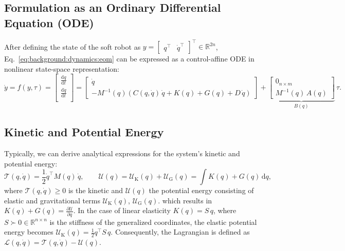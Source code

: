 \subsection{Formulation as an Ordinary Differential Equation (ODE)}
After defining the state of the soft robot as $y = \begin{bmatrix}
    q^\top & \dot{q}^\top
\end{bmatrix}^\top \in \mathbb{R}^{2n}$, Eq.~\ref{eq:background:dynamics:eom} can be expressed as a control-affine \gls{ODE} in nonlinear state-space representation:
\begin{equation}
    \dot{y} = f(y,\tau) = \begin{bmatrix}
        \frac{\mathrm{d} q}{\mathrm{d}t}\\
        \frac{\mathrm{d} \dot{q}}{\mathrm{d}t}\\
    \end{bmatrix} = \begin{bmatrix}
        \dot{q}\\
        -M^{-1}(q) \left ( C(q,\dot{q}) \, \dot{q} + K(q) + G(q) + D \, \dot{q} \right )
    \end{bmatrix} + \underbrace{\begin{bmatrix}
        0_{n \times m}\\ M^{-1}(q) \, A(q)
    \end{bmatrix}}_{B(q)} \, \tau.
\end{equation}

\subsection{Kinetic and Potential Energy}
Typically, we can derive analytical expressions for the system’s kinetic and potential energy:
\begin{equation}
    \mathcal{T}(q,\dot{q}) = \frac{1}{2} \dot{q}^\top M(q) \, \dot{q},
    \qquad
    \mathcal{U}(q) = \mathcal{U}_\mathrm{K}(q) + \mathcal{U}_\mathrm{G}(q) = \int K(q) + G(q) \, \mathrm{d}q,
\end{equation}
where $\mathcal{T}(q,\dot{q}) \geq 0$ is the kinetic and $\mathcal{U}(q)$ the potential energy consisting of elastic and gravitational terms $\mathcal{U}_\mathrm{K}(q)$, $\mathcal{U}_\mathrm{G}(q)$.
which results in $K(q) + G(q) = \frac{\partial \mathcal{U}}{\partial q}$. 
In the case of linear elasticity $K(q) = S \, q$, where $S \succ 0 \in \mathbb{R}^{n \times n}$ is the stiffness of the generalized coordinates, the elastic potential energy becomes $\mathcal{U}_\mathrm{K}(q) = \frac{1}{2} q^\top S \, q$.
Consequently, the Lagrangian is defined as $\mathcal{L}(q,\dot{q}) = \mathcal{T}(q,\dot{q}) - \mathcal{U}(q)$.

